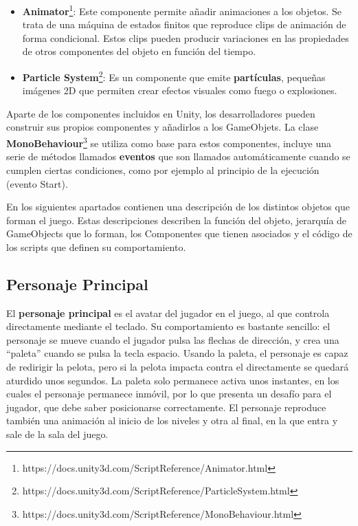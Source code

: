 \begin{itemize}
\item \textbf{Animator}\footnote{https://docs.unity3d.com/ScriptReference/Animator.html}: Este componente permite añadir animaciones a los objetos. Se trata de una máquina de estados finitos que reproduce clips de animación de forma condicional. Estos clips pueden producir variaciones en las propiedades de otros componentes del objeto en función del tiempo.
\item \textbf{Particle System}\footnote{https://docs.unity3d.com/ScriptReference/ParticleSystem.html}: Es un componente que emite \textbf{partículas}, pequeñas imágenes 2D que permiten crear efectos visuales como fuego o explosiones.
\end{itemize}

Aparte de los componentes incluidos en Unity, los desarrolladores pueden construir sus propios componentes y añadirlos a los GameObjets. La clase \textbf{MonoBehaviour}\footnote{https://docs.unity3d.com/ScriptReference/MonoBehaviour.html
} se utiliza como base para estos componentes, incluye una serie de métodos llamados \textbf{eventos} que son llamados automáticamente cuando se cumplen ciertas condiciones, como por ejemplo al principio de la ejecución (evento Start).

En los siguientes apartados contienen una descripción de los distintos objetos que forman el juego. Estas descripciones describen la función del objeto, jerarquía de GameObjects que lo forman, los Componentes que tienen asociados y el código de los scripts que definen su comportamiento.

\subsection{Personaje Principal}
El \textbf{personaje principal} es el avatar del jugador en el juego, al que controla directamente mediante el teclado. Su comportamiento es bastante sencillo: el personaje se mueve cuando el jugador pulsa las flechas de dirección, y crea una ``paleta'' cuando se pulsa la tecla espacio. Usando la paleta, el personaje es capaz de redirigir la pelota, pero si la pelota impacta contra el directamente se quedará aturdido unos segundos. La paleta solo permanece activa unos instantes, en los cuales el personaje permanece inmóvil, por lo que presenta un desafío para el jugador, que debe saber posicionarse correctamente. El personaje reproduce también una animación al inicio de los niveles y otra al final, en la que entra y sale de la sala del juego.

